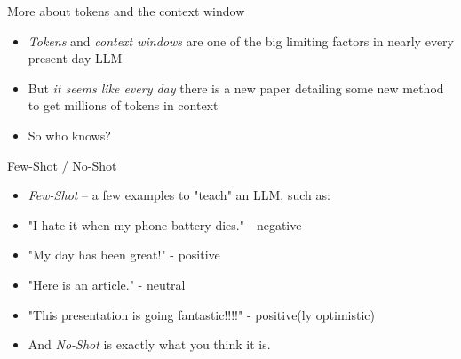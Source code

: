 \documentclass[handout]{beamer} %
\begin{document}

\begin{frame}[plain]
\end{frame}

\begin{frame}{More about tokens and the context window}
	\begin{itemize}
		\item \textit{Tokens} and \textit{context windows} are one of the big limiting factors in nearly every present-day LLM
		\pause
		\item But \textit{it seems like every day} there is a new paper detailing some new method to get millions of tokens in context
		\pause
		\item So who knows?
	\end{itemize}
	
\end{frame}

\begin{frame}{Few-Shot / No-Shot}
	\begin{itemize}
		\item \textit{Few-Shot} -- a few examples to "teach" an LLM, such as:
		\pause
		\item "I hate it when my phone battery dies." - negative
		\pause
		\item "My day has been great!" - positive
		\pause
		\item "Here is an article." - neutral
		\pause
		\item "This presentation is going fantastic!!!!" - positive(ly optimistic)
		\pause
		\item And \textit{No-Shot} is exactly what you think it is.
	\end{itemize}
\end{frame}
\end{document}
